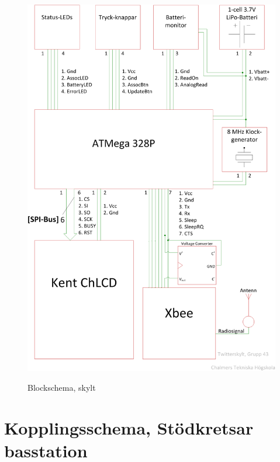 \documentclass[a4paper,11pt]{article}
\begin{document}
\begin{figure}[H]
\includegraphics[scale=0.6, angle=0]{block_skylt.png}
\label{fig:block_skylt}
\caption{Blockschema, skylt}
\end{figure}
\pagebreak

\section{Kopplingsschema, Stödkretsar basstation}
\end{document}
